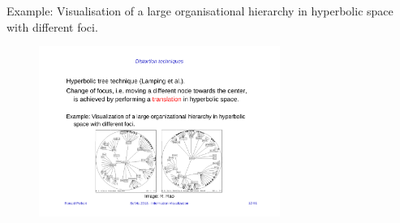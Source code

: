 Example: Visualisation of a large organisational hierarchy in hyperbolic space with different foci.

\begin{figure}[H]
\centering
\includegraphics[width=0.7\textwidth]{img/12_hyperbolic_tree}
\end{figure}
